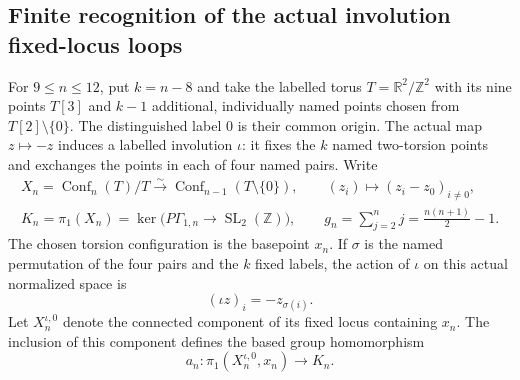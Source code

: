 \subsection{Finite recognition of the actual involution fixed-locus loops}

For $9\leq n\leq12$, put $k=n-8$ and take the labelled torus
$T=\mathbb R^2/\mathbb Z^2$ with its nine points $T[3]$ and
$k-1$ additional, individually named points chosen from
$T[2]\setminus\{0\}$.  The distinguished label $0$ is their
common origin.  The actual map $z\mapsto-z$ induces a labelled
involution $\iota$: it fixes the $k$ named two-torsion points and
exchanges the points in each of four named pairs.
Write
\[
 \begin{gathered}
 X_n=\operatorname{Conf}_n(T)/T
       \xrightarrow{\sim}\operatorname{Conf}_{n-1}(T\setminus\{0\}),
 \qquad (z_i)\longmapsto(z_i-z_0)_{i\ne0},\\
 K_n=\pi_1(X_n)=\ker\bigl(P\Gamma_{1,n}\to
                                      \operatorname{SL}_2(\mathbb Z)\bigr),
 \qquad g_n=\sum_{j=2}^{n}j=\frac{n(n+1)}2-1.
 \end{gathered}                                                 \tag{ICR.1}
\]
The chosen torsion configuration is the basepoint $x_n$.  If $\sigma$
is the named permutation of the four pairs and the $k$ fixed labels,
the action of $\iota$ on this actual normalized space is
\[
                         (\iota z)_i=-z_{\sigma(i)}.
                                                               \tag{ICR.2}
\]
Let $X_n^{\iota,0}$ denote the connected component of its fixed
locus containing $x_n$.  The inclusion of this component defines
the based group homomorphism
\[
              a_n:\pi_1(X_n^{\iota,0},x_n)\longrightarrow K_n.
                                                               \tag{ICR.3}
\]

